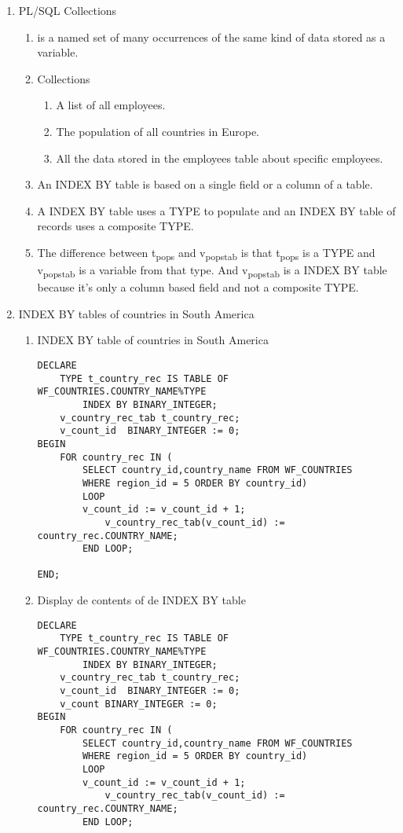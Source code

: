 \documentclass[11pt]{article}
\begin{document}
\begin{enumerate}
\item PL/SQL Collections
\begin{enumerate}
\item is a named set of many occurrences of the same kind of data stored as a variable.
\item Collections
\begin{enumerate}
\item A list of all employees.
\item The population of all countries in Europe.
\item All the data stored in the employees table about specific employees.
\end{enumerate}
\item An INDEX BY table is based on a single field or a column of a table.
\item A INDEX BY table uses a TYPE to populate and an INDEX BY table of records uses
a composite TYPE.
\item The difference between t\textsubscript{pops} and v\textsubscript{pops}\textsubscript{tab} is that t\textsubscript{pops} is a TYPE and v\textsubscript{pops}\textsubscript{tab}
is a variable from that type. And v\textsubscript{pops}\textsubscript{tab} is a INDEX BY table because it's only
a column based field and not a composite TYPE.
\end{enumerate}
\item INDEX BY tables of countries in South America
\begin{enumerate}
\item INDEX BY table of countries in South America
\begin{verbatim}
DECLARE
    TYPE t_country_rec IS TABLE OF WF_COUNTRIES.COUNTRY_NAME%TYPE
        INDEX BY BINARY_INTEGER;
    v_country_rec_tab t_country_rec;
    v_count_id  BINARY_INTEGER := 0;
BEGIN
    FOR country_rec IN (
        SELECT country_id,country_name FROM WF_COUNTRIES
        WHERE region_id = 5 ORDER BY country_id)
        LOOP
        v_count_id := v_count_id + 1;
            v_country_rec_tab(v_count_id) := country_rec.COUNTRY_NAME;
        END LOOP;

END;
\end{verbatim}
\item Display de contents of de INDEX BY table
\begin{verbatim}
DECLARE
    TYPE t_country_rec IS TABLE OF WF_COUNTRIES.COUNTRY_NAME%TYPE
        INDEX BY BINARY_INTEGER;
    v_country_rec_tab t_country_rec;
    v_count_id  BINARY_INTEGER := 0;
    v_count BINARY_INTEGER := 0;
BEGIN
    FOR country_rec IN (
        SELECT country_id,country_name FROM WF_COUNTRIES
        WHERE region_id = 5 ORDER BY country_id)
        LOOP
        v_count_id := v_count_id + 1;
            v_country_rec_tab(v_count_id) := country_rec.COUNTRY_NAME;
        END LOOP;


\end{verbatim}
\end{enumerate}
\end{enumerate}
\end{document}
